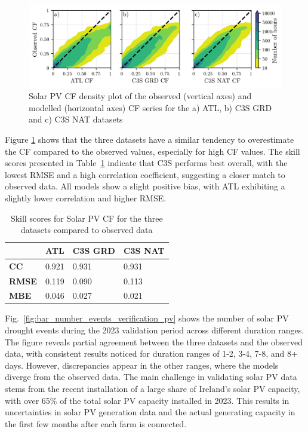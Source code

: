 \documentclass[preprint, 12pt]{elsarticle}
\begin{document}
\begin{figure}[h!]
	\centering
	\includegraphics[width=\textwidth]{verification_pv_contour.png}
	\caption{Solar PV CF density plot of the observed (vertical axes) and modelled (horizontal axes) CF series for the a) ATL, b) C3S GRD and c) C3S NAT datasets}	
	\label{fig:solar_verification_contour}
\end{figure}

Figure \ref{fig:solar_verification_contour} shows that the three datasets have a similar tendency to overestimate the CF compared to the observed values, especially for high CF values. The skill scores presented in Table~\ref{tab:pv_skill_scores} indicate that C3S performs best overall, with the lowest RMSE and a high correlation coefficient, suggesting a closer match to observed data. All models show a slight positive bias, with ATL exhibiting a slightly lower correlation and higher RMSE.

\begin{table}[!ht]
	\centering
	\begin{tabular}{l|lll|}
		\cline{2-4}
		& \textbf{ATL} & \textbf{C3S GRD} & \textbf{C3S NAT} \\ \hline
		\multicolumn{1}{|l|}{\textbf{CC}}   & 0.921           & 0.931            & 0.931            \\ \hline
		\multicolumn{1}{|l|}{\textbf{RMSE}} & 0.119           & 0.090            & 0.113            \\ \hline
		\multicolumn{1}{|l|}{\textbf{MBE}}   & 0.046           & 0.027           & 0.021           \\ \hline
	\end{tabular}
	\caption{Skill scores for Solar PV CF for the three datasets compared to observed data}
	\label{tab:pv_skill_scores}
\end{table}

Fig.~\ref{fig:bar_number_events_verification_pv} shows the number of solar PV drought events during the 2023 validation period across different duration ranges. The figure reveals partial agreement between the three datasets and the observed data, with consistent results noticed for duration ranges of 1-2, 3-4, 7-8, and 8+ days. However, discrepancies appear in the other ranges, where the models diverge from the observed data. The main challenge in validating solar PV data stems from the recent installation of a large share of Ireland’s solar PV capacity, with over 65\% of the total solar PV capacity installed in 2023. This results in uncertainties in solar PV generation data and the actual generating capacity in the first few months after each farm is connected.
\end{document}
